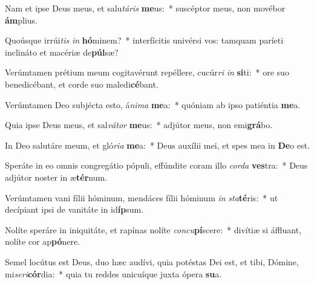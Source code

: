 \item Nam et ipse Deus meus, et salu\textit{tá}\textit{ris} \textbf{me}us:~* suscéptor meus, non movébor \textbf{ám}plius.
\item Quoúsque irrúi\textit{tis} \textit{in} \textbf{hó}minem?~* interfícitis univérsi vos: tamquam paríeti inclináto et macériæ de\textbf{púl}sæ?
\item Verúmtamen prétium meum cogitavérunt repéllere, cucúr\textit{ri} \textit{in} \textbf{si}ti:~* ore suo benedicébant, et corde suo maledi\textbf{cé}bant.
\item Verúmtamen Deo subjécta esto, á\textit{ni}\textit{ma} \textbf{me}a:~* quóniam ab ipso patiéntia \textbf{me}a.
\item Quia ipse Deus meus, et sal\textit{vá}\textit{tor} \textbf{me}us:~* adjútor meus, non emi\textbf{grá}bo.
\item In Deo salutáre meum, et gló\textit{ri}\textit{a} \textbf{me}a:~* Deus auxílii mei, et spes mea in \textbf{De}o est.
\item Speráte in eo omnis congregátio pópuli, effúndite coram illo \textit{cor}\textit{da} \textbf{ves}tra:~* Deus adjútor noster in æ\textbf{tér}num.
\item Verúmtamen vani fílii hóminum, mendáces fílii hóminum \textit{in} \textit{sta}\textbf{té}ris:~* ut decípiant ipsi de vanitáte in id\textbf{íp}sum.
\item Nolíte speráre in iniquitáte, et rapínas nolíte \textit{con}\textit{cu}\textbf{pí}scere:~* divítiæ si áffluant, nolíte cor ap\textbf{pó}nere.
\item Semel locútus est Deus, duo hæc audívi, quia potéstas Dei est, et tibi, Dómine, mi\textit{se}\textit{ri}\textbf{cór}dia:~* quia tu reddes unicuíque juxta ópera \textbf{su}a.
